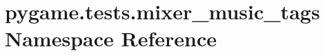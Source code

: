 \hypertarget{namespacepygame_1_1tests_1_1mixer__music__tags}{}\section{pygame.\+tests.\+mixer\+\_\+music\+\_\+tags Namespace Reference}
\label{namespacepygame_1_1tests_1_1mixer__music__tags}
